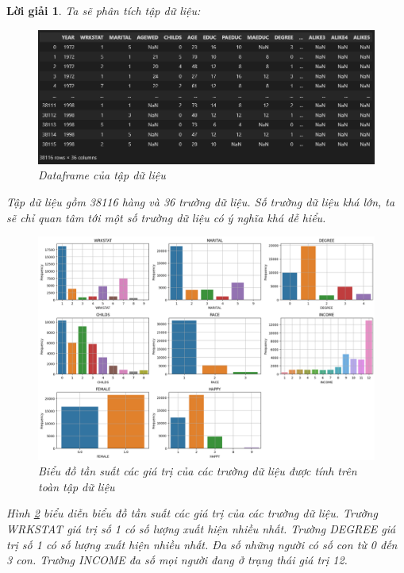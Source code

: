 \documentclass[14pt, a4paper]{article}
\theoremstyle{sltheorem}
\theoremstyle{soltheorem}
\newtheorem*{loigiai}{Lời giải}
\begin{document}
\begin{loigiai}

    Ta sẽ phân tích tập dữ liệu:

    \begin{figure}[H]
        \centering
        \includegraphics[width=0.8\linewidth]{figures/overall_df.png}
        \caption{Dataframe của tập dữ liệu}
        \label{fig:overall_df}
    \end{figure}

    Tập dữ liệu gồm 38116 hàng và 36 trường dữ liệu.
    Số trường dữ liệu khá lớn, ta sẽ chỉ quan tâm tới một số trường dữ liệu có ý nghĩa khá dễ hiểu.

    \begin{figure}[H]
        \centering
        \includegraphics[width=0.6\linewidth]{figures/overall_frequency.png}
        \caption{Biểu đồ tần suất các giá trị của các trường dữ liệu được tính trên toàn tập dữ liệu}
        \label{fig:overall_frequency}
    \end{figure}

    Hình \ref{fig:overall_frequency} biểu diễn biểu đồ tần suất các giá trị của các trường dữ liệu.
    Trường WRKSTAT giá trị số 1 có số lượng xuất hiện nhiều nhất.
    Trường DEGREE giá trị số 1 có số lượng xuất hiện nhiều nhất.
    Đa số những người có số con từ 0 đến 3 con.
    Trường INCOME đa số mọi người đang ở trạng thái giá trị 12.


\end{loigiai}
\end{document}
